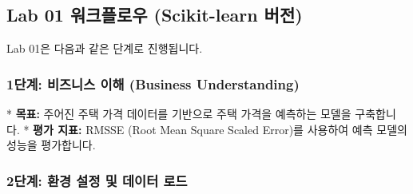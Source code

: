 \documentclass[11pt,a4paper]{article}
\begin{document}
\subsection{Lab 01 워크플로우 (Scikit-learn 버전)}

Lab 01은 다음과 같은 단계로 진행됩니다.

\subsubsection{1단계: 비즈니스 이해 (Business Understanding)}
*   \textbf{목표:} 주어진 주택 가격 데이터를 기반으로 주택 가격을 예측하는 모델을 구축합니다.
*   \textbf{평가 지표:} RMSSE (Root Mean Square Scaled Error)를 사용하여 예측 모델의 성능을 평가합니다.

\subsubsection{2단계: 환경 설정 및 데이터 로드}
\end{document}
